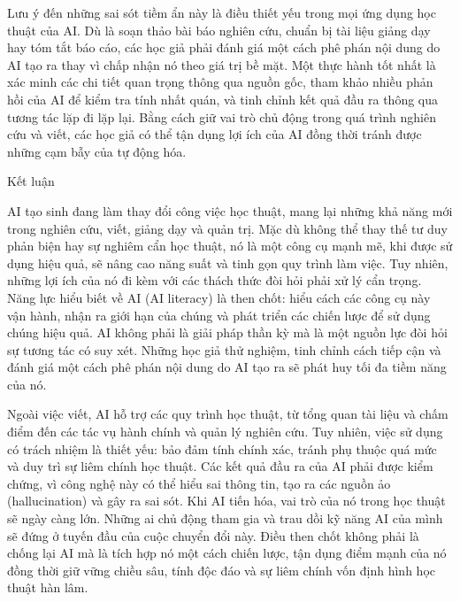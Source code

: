 Lưu ý đến những sai sót tiềm ẩn này là điều thiết yếu trong mọi ứng dụng học thuật của AI. Dù là soạn thảo bài báo nghiên cứu, chuẩn bị tài liệu giảng dạy hay tóm tắt báo cáo, các học giả phải đánh giá một cách phê phán nội dung do AI tạo ra thay vì chấp nhận nó theo giá trị bề mặt. Một thực hành tốt nhất là xác minh các chi tiết quan trọng thông qua nguồn gốc, tham khảo nhiều phản hồi của AI để kiểm tra tính nhất quán, và tinh chỉnh kết quả đầu ra thông qua tương tác lặp đi lặp lại. Bằng cách giữ vai trò chủ động trong quá trình nghiên cứu và viết, các học giả có thể tận dụng lợi ích của AI đồng thời tránh được những cạm bẫy của tự động hóa.

Kết luận

AI tạo sinh đang làm thay đổi công việc học thuật, mang lại những khả năng mới trong nghiên cứu, viết, giảng dạy và quản trị. Mặc dù không thể thay thế tư duy phản biện hay sự nghiêm cẩn học thuật, nó là một công cụ mạnh mẽ, khi được sử dụng hiệu quả, sẽ nâng cao năng suất và tinh gọn quy trình làm việc. Tuy nhiên, những lợi ích của nó đi kèm với các thách thức đòi hỏi phải xử lý cẩn trọng. Năng lực hiểu biết về AI (AI literacy) là then chốt: hiểu cách các công cụ này vận hành, nhận ra giới hạn của chúng và phát triển các chiến lược để sử dụng chúng hiệu quả. AI không phải là giải pháp thần kỳ mà là một nguồn lực đòi hỏi sự tương tác có suy xét. Những học giả thử nghiệm, tinh chỉnh cách tiếp cận và đánh giá một cách phê phán nội dung do AI tạo ra sẽ phát huy tối đa tiềm năng của nó.

Ngoài việc viết, AI hỗ trợ các quy trình học thuật, từ tổng quan tài liệu và chấm điểm đến các tác vụ hành chính và quản lý nghiên cứu. Tuy nhiên, việc sử dụng có trách nhiệm là thiết yếu: bảo đảm tính chính xác, tránh phụ thuộc quá mức và duy trì sự liêm chính học thuật. Các kết quả đầu ra của AI phải được kiểm chứng, vì công nghệ này có thể hiểu sai thông tin, tạo ra các nguồn ảo (hallucination) và gây ra sai sót. Khi AI tiến hóa, vai trò của nó trong học thuật sẽ ngày càng lớn. Những ai chủ động tham gia và trau dồi kỹ năng AI của mình sẽ đứng ở tuyến đầu của cuộc chuyển đổi này. Điều then chốt không phải là chống lại AI mà là tích hợp nó một cách chiến lược, tận dụng điểm mạnh của nó đồng thời giữ vững chiều sâu, tính độc đáo và sự liêm chính vốn định hình học thuật hàn lâm.
